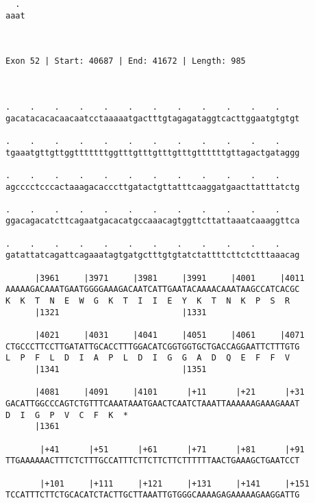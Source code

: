 \documentclass{article}
\begin{document}
\begin{Verbatim}
  . 
aaat
    
    
 
Exon 52 | Start: 40687 | End: 41672 | Length: 985



.    .    .    .    .    .    .    .    .    .    .    .    
gacatacacacaacaatcctaaaaatgactttgtagagataggtcacttggaatgtgtgt
                                                            
.    .    .    .    .    .    .    .    .    .    .    .    
tgaaatgttgttggtttttttggtttgtttgtttgtttgttttttgttagactgataggg
                                                            
.    .    .    .    .    .    .    .    .    .    .    .    
agcccctcccactaaagacacccttgatactgttatttcaaggatgaacttatttatctg
                                                            
.    .    .    .    .    .    .    .    .    .    .    .    
ggacagacatcttcagaatgacacatgccaaacagtggttcttattaaatcaaaggttca
                                                            
.    .    .    .    .    .    .    .    .    .    .    .    
gatattatcagattcagaaatagtgatgctttgtgtatctattttcttctctttaaacag
                                                            
      |3961     |3971     |3981     |3991     |4001     |4011
AAAAAGACAAATGAATGGGGAAAGACAATCATTGAATACAAAACAAATAAGCCATCACGC
K  K  T  N  E  W  G  K  T  I  I  E  Y  K  T  N  K  P  S  R  
      |1321                         |1331                   
  
      |4021     |4031     |4041     |4051     |4061     |4071
CTGCCCTTCCTTGATATTGCACCTTTGGACATCGGTGGTGCTGACCAGGAATTCTTTGTG
L  P  F  L  D  I  A  P  L  D  I  G  G  A  D  Q  E  F  F  V  
      |1341                         |1351                   
  
      |4081     |4091     |4101      |+11      |+21      |+31
GACATTGGCCCAGTCTGTTTCAAATAAATGAACTCAATCTAAATTAAAAAAGAAAGAAAT
D  I  G  P  V  C  F  K  *   
      |1361                                                 
  
       |+41      |+51      |+61      |+71      |+81      |+91
TTGAAAAAACTTTCTCTTTGCCATTTCTTCTTCTTCTTTTTTAACTGAAAGCTGAATCCT
                                                            
       |+101     |+111     |+121     |+131     |+141     |+151
TCCATTTCTTCTGCACATCTACTTGCTTAAATTGTGGGCAAAAGAGAAAAAGAAGGATTG
                                                            

\end{Verbatim}
\end{document}

